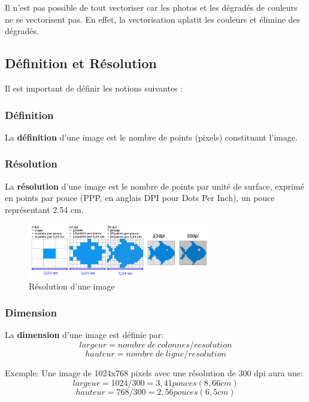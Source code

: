 \documentclass[11pt, a4paper]{book}
\begin{document}
\begin{remarque}

Il n’est pas possible de tout vectoriser car les photos et les dégradés de couleurs ne se vectorisent pas. En effet, la vectorisation aplatit les couleurs et élimine des dégradés.

\end{remarque}

\subsection{Définition et Résolution}
Il est important de définir les notions suivantes : 
\subsubsection{Définition}
 La \textbf{définition} d'une image est le nombre de points (pixels) constituant l’image.
 
\subsubsection{Résolution}
 La \textbf{résolution} d'une image est le nombre de points par unité de surface, exprimé en points par pouce (PPP, en anglais DPI pour Dots Per Inch), un pouce représentant 2.54 cm.

\begin{center}
\begin{figure} [h!]
\centering
\includegraphics[width=8cm]{images/dpi_poisson.png}
\caption{Résolution d'une image}
\end{figure}
\end{center}

\subsubsection{Dimension}
La \textbf{dimension} d’une image est définie par:
$$largeur = nombre\ de\ colonnes / resolution$$
$$hauteur = nombre\ de\ ligne / resolution$$

Exemple: Une image de 1024x768 pixels avec une résolution de 300 dpi aura une:
$$largeur = 1024 / 300 = 3,41 pouces (8,66 cm)$$
$$hauteur = 768 / 300 = 2,56 pouces (6,5 cm)$$
\end{document}
